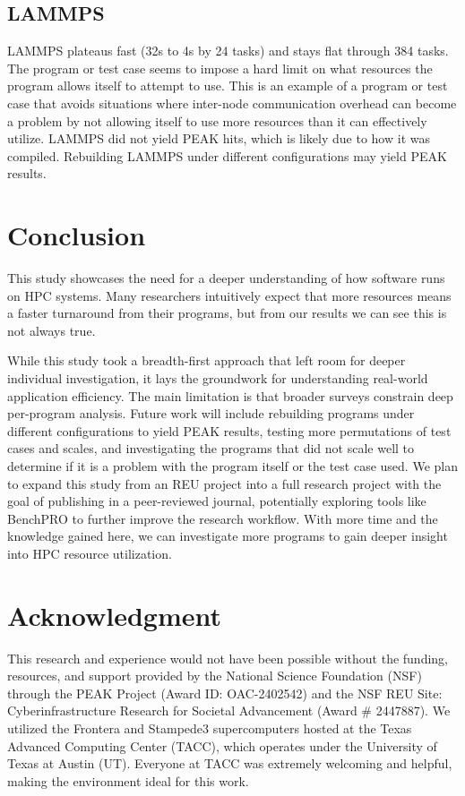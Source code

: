 \documentclass[conference]{IEEEtran}
\begin{document}
\subsection{LAMMPS}
LAMMPS plateaus fast (32s to 4s by 24 tasks) and stays flat through 384 tasks. The program or test case seems to impose a hard limit on what resources the program allows itself to attempt to use. This is an example of a program or test case that avoids situations where inter-node communication overhead can become a problem by not allowing itself to use more resources than it can effectively utilize. LAMMPS did not yield PEAK hits, which is likely due to how it was compiled. Rebuilding LAMMPS under different configurations may yield PEAK results.

\section{Conclusion}
This study showcases the need for a deeper understanding of how software runs on HPC systems. Many researchers intuitively expect that more resources means a faster turnaround from their programs, but from our results we can see this is not always true.

While this study took a breadth-first approach that left room for deeper individual investigation, it lays the groundwork for understanding real-world application efficiency. The main limitation is that broader surveys constrain deep per-program analysis. Future work will include rebuilding programs under different configurations to yield PEAK results, testing more permutations of test cases and scales, and investigating the programs that did not scale well to determine if it is a problem with the program itself or the test case used. We plan to expand this study from an REU project into a full research project with the goal of publishing in a peer-reviewed journal, potentially exploring tools like BenchPRO to further improve the research workflow. With more time and the knowledge gained here, we can investigate more programs to gain deeper insight into HPC resource utilization.

\section*{Acknowledgment}
This research and experience would not have been possible without the funding, resources, and support provided by the National Science Foundation (NSF) through the PEAK Project (Award ID: OAC-2402542) and the NSF REU Site: Cyberinfrastructure Research for Societal Advancement (Award \# 2447887). We utilized the Frontera and Stampede3 supercomputers hosted at the Texas Advanced Computing Center (TACC), which operates under the University of Texas at Austin (UT). Everyone at TACC was extremely welcoming and helpful, making the environment ideal for this work.
\end{document}
